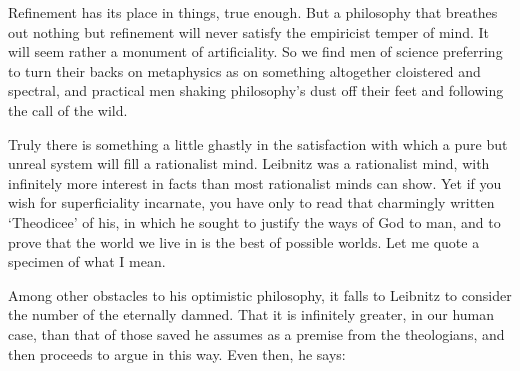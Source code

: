 \documentclass[]{article}
\begin{document}
Refinement has its place in things, true enough. But a philosophy that
breathes out nothing but refinement will never satisfy the empiricist
temper of mind. It will seem rather a monument of artificiality. So we
find men of science preferring to turn their backs on metaphysics as on
something altogether cloistered and spectral, and practical men shaking
philosophy's dust off their feet and following the call of the wild.

Truly there is something a little ghastly in the satisfaction with which
a pure but unreal system will fill a rationalist mind. Leibnitz was
a rationalist mind, with infinitely more interest in facts than
most rationalist minds can show. Yet if you wish for superficiality
incarnate, you have only to read that charmingly written `Theodicee' of
his, in which he sought to justify the ways of God to man, and to prove
that the world we live in is the best of possible worlds. Let me quote a
specimen of what I mean.

Among other obstacles to his optimistic philosophy, it falls to Leibnitz
to consider the number of the eternally damned. That it is infinitely
greater, in our human case, than that of those saved he assumes as a
premise from the theologians, and then proceeds to argue in this way.
Even then, he says:
\end{document}

